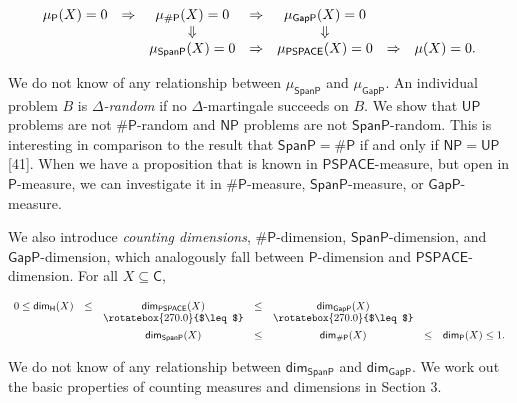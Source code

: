 \documentclass[10pt,a4paper]{article}
\begin{document}
\[\begin{gathered}
\begin{array}[]{ccccccc}\mu_{\mathsf{P}}(X)=0&\Rightarrow&\mu_{{\mathsf{\#}\mathsf{P}}}(X)=0&\Rightarrow&\mu_{\mathsf{GapP}}(X)=0\\
&&\Downarrow&&\Downarrow\\
&&\mu_{\mathsf{SpanP}}(X)=0&\Rightarrow&\mu_{\mathsf{PSPACE}}(X)=0&\Rightarrow&\mu(X)=0.\end{array}
\end{gathered}\]


We do not know of any relationship between $\mu_{\mathsf{SpanP}}$ and $\mu_{\mathsf{GapP}}$.
An individual problem $B$ is $\Delta$\emph{-random} if no $\Delta$-martingale succeeds on $B$.
We show that $\mathsf{UP}$ problems are not ${\mathsf{\#}\mathsf{P}}$-random and $\mathsf{NP}$ problems are not $\mathsf{SpanP}$-random. This is interesting in comparison to the result that $\mathsf{SpanP}={\mathsf{\#}\mathsf{P}}$ if and only if $\mathsf{NP}=\mathsf{UP}$ [41].
When we have a proposition that is known in $\mathsf{PSPACE}$-measure, but open in
$\mathsf{P}$-measure, we can investigate it in ${\mathsf{\#}\mathsf{P}}$-measure, $\mathsf{SpanP}$-measure, or $\mathsf{GapP}$-measure.\par




We also introduce \emph{counting dimensions}, ${\mathsf{\#}\mathsf{P}}$-dimension, $\mathsf{SpanP}$-dimension, and $\mathsf{GapP}$-dimension, which analogously fall between $\mathsf{P}$-dimension and $\mathsf{PSPACE}$-dimension. For all $X\subseteq\mathsf{C}$,\par


\[\begin{gathered}
\begin{array}[]{ccccccc}0\leq{\mathsf{dim}}_{\mathsf{H}}(X)&\leq&{\mathsf{dim}}_{\mathsf{PSPACE}}(X)&\leq&{\mathsf{dim}}_{\mathsf{GapP}}(X)\\
&&\mathrel{\raisebox{4.30554pt}{\rotatebox{270.0}{$\leq$}}}&&\mathrel{\raisebox{4.30554pt}{\rotatebox{270.0}{$\leq$}}}\\
&&{\mathsf{dim}}_{\mathsf{SpanP}}(X)&\leq&{\mathsf{dim}}_{\mathsf{\#}\mathsf{P}}(X)&\leq&{\mathsf{dim}}_{\mathsf{P}}(X)\leq 1.\end{array}
\end{gathered}\]


We do not know of any relationship between ${\mathsf{dim}}_{\mathsf{SpanP}}$ and ${\mathsf{dim}}_{\mathsf{GapP}}$.
We work out the basic properties of counting measures and dimensions in Section 3.\par
\end{document}
